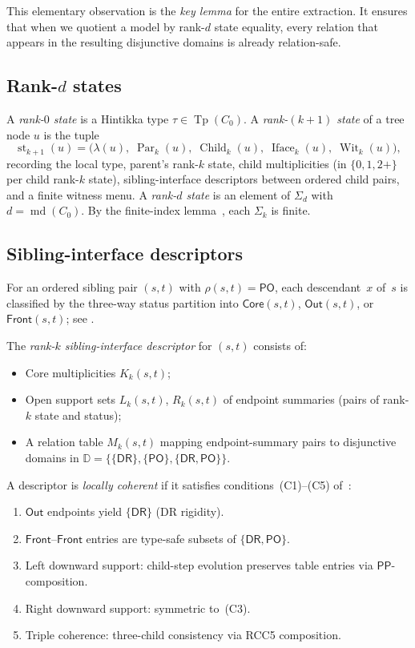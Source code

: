 \documentclass[11pt]{article}
\theoremstyle{definition}
\theoremstyle{remark}
\newcommand{\DR}{\mathsf{DR}}
\newcommand{\PO}{\mathsf{PO}}
\newcommand{\PP}{\mathsf{PP}}
\newcommand{\Tp}{\operatorname{Tp}}
\newcommand{\md}{\operatorname{md}}
\newcommand{\st}{\operatorname{st}}
\newcommand{\Core}{\mathsf{Core}}
\newcommand{\Out}{\mathsf{Out}}
\newcommand{\Front}{\mathsf{Front}}
\newcommand{\Wit}{\operatorname{Wit}}
\newcommand{\Iface}{\operatorname{Iface}}
\newcommand{\Child}{\operatorname{Child}}
\newcommand{\Par}{\operatorname{Par}}
\begin{document}
This elementary observation is the \emph{key lemma} for the entire
extraction.  It ensures that when we quotient a model by rank-$d$
state equality, every relation that appears in the resulting
disjunctive domains is already relation-safe.

\subsection{Rank-$d$ states}

A \emph{rank-$0$ state} is a Hintikka type $\tau\in\Tp(C_0)$.
A \emph{rank-$(k{+}1)$ state} of a tree node $u$ is the tuple
\[
\st_{k+1}(u) = \bigl(\lambda(u),\;\Par_k(u),\;\Child_k(u),\;
  \Iface_k(u),\;\Wit_k(u)\bigr),
\]
recording the local type, parent's rank-$k$ state, child multiplicities
(in $\{0,1,2{+}\}$ per child rank-$k$ state), sibling-interface
descriptors between ordered child pairs, and a finite witness menu.
A \emph{rank-$d$ state} is an element of $\Sigma_d$ with $d=\md(C_0)$.
By the finite-index lemma~\cite[Theorem~1.25]{SplitForest}, each
$\Sigma_k$ is finite.

\subsection{Sibling-interface descriptors}

For an ordered sibling pair $(s,t)$ with $\rho(s,t)=\PO$, each
descendant~$x$ of~$s$ is classified by the three-way status partition
into $\Core(s,t)$, $\Out(s,t)$, or $\Front(s,t)$; see
\cite[Definition~1.6, Theorem~1.4]{SplitForest}.

The \emph{rank-$k$ sibling-interface descriptor} for $(s,t)$ consists of:
\begin{itemize}
\item Core multiplicities $K_k(s,t)$;
\item Open support sets $L_k(s,t)$, $R_k(s,t)$ of endpoint summaries
  (pairs of rank-$k$ state and status);
\item A relation table $M_k(s,t)$ mapping endpoint-summary pairs to
  disjunctive domains in
  $\mathbb{D}=\{\{\DR\},\{\PO\},\{\DR,\PO\}\}$.
\end{itemize}

A descriptor is \emph{locally coherent} if it satisfies
conditions~(C1)--(C5) of~\cite[Definition~1.8]{SplitForest}:
\begin{enumerate}[label=(C\arabic*)]
\item $\Out$ endpoints yield $\{\DR\}$ (DR rigidity).
\item $\Front$--$\Front$ entries are type-safe subsets of
  $\{\DR,\PO\}$.
\item Left downward support: child-step evolution preserves table
  entries via $\PP$-composition.
\item Right downward support: symmetric to~(C3).
\item Triple coherence: three-child consistency via RCC5 composition.
\end{enumerate}
\end{document}
